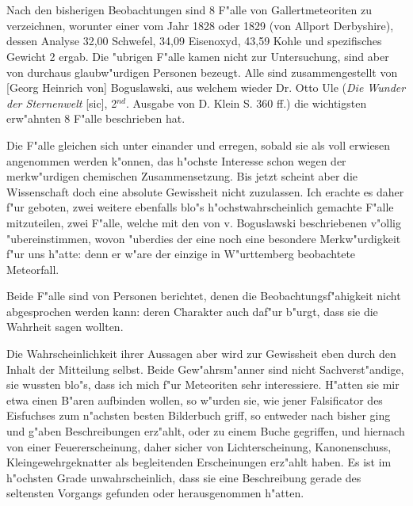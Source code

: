 \documentclass[a4paper, 11pt, oneside, german]{article}
\begin{document}
\section{}
\paragraph{}
Nach den bisherigen Beobachtungen sind 8 F"alle von Gallertmeteoriten zu verzeichnen, worunter einer vom Jahr 1828 oder 1829 (von Allport Derbyshire), dessen Analyse 32,00 Schwefel, 34,09 Eisenoxyd, 43,59 Kohle und spezifisches Gewicht 2 ergab. Die "ubrigen F"alle kamen nicht zur Untersuchung, sind aber von durchaus glaubw"urdigen Personen bezeugt. Alle sind zusammengestellt von [Georg Heinrich von] Boguslawski, aus welchem wieder Dr. Otto Ule (\emph{Die Wunder der Sternenwelt} [sic], 2$^{nd}$. Ausgabe von D. Klein S. 360 ff.) die wichtigsten erw"ahnten 8 F"alle beschrieben hat.

Die F"alle gleichen sich unter einander und erregen, sobald sie als voll erwiesen angenommen werden k"onnen, das h"ochste Interesse schon wegen der merkw"urdigen chemischen Zusammensetzung. Bis jetzt scheint aber die Wissenschaft doch eine absolute Gewissheit nicht zuzulassen. Ich erachte es daher f"ur geboten, zwei weitere ebenfalls blo"s h"ochstwahrscheinlich gemachte F"alle mitzuteilen, zwei F"alle, welche mit den von v. Boguslawski beschriebenen v"ollig "ubereinstimmen, wovon "uberdies der eine noch eine besondere Merkw"urdigkeit f"ur uns h"atte: denn er w"are der einzige in W"urttemberg beobachtete Meteorfall.

Beide F"alle sind von Personen berichtet, denen die Beobachtungsf"ahigkeit nicht abgesprochen werden kann: deren Charakter auch daf"ur b"urgt, dass sie die Wahrheit sagen wollten.

Die Wahrscheinlichkeit ihrer Aussagen aber wird zur Gewissheit eben durch den Inhalt der Mitteilung selbst. Beide Gew"ahrsm"anner sind nicht Sachverst"andige, sie wussten blo"s, dass ich mich f"ur Meteoriten sehr interessiere. H"atten sie mir etwa einen B"aren aufbinden wollen, so w"urden sie, wie jener Falsificator des Eisfuchses zum n"achsten besten Bilderbuch griff, so entweder nach bisher ging und g"aben Beschreibungen erz"ahlt, oder zu einem Buche gegriffen, und hiernach von einer Feuererscheinung, daher sicher von Lichterscheinung, Kanonenschuss, Kleingewehrgeknatter als begleitenden Erscheinungen erz"ahlt haben. Es ist im h"ochsten Grade unwahrscheinlich, dass sie eine Beschreibung gerade des seltensten Vorgangs gefunden oder herausgenommen h"atten.
\end{document}
